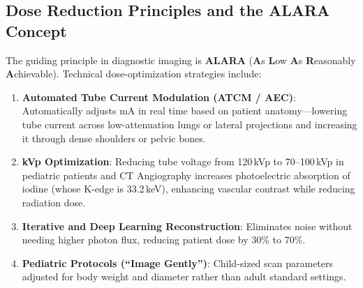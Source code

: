 \documentclass[11pt,a4paper]{article}
\begin{document}
\subsection{Dose Reduction Principles and the ALARA Concept}
The guiding principle in diagnostic imaging is \textbf{ALARA} (\textbf{A}s \textbf{L}ow \textbf{A}s \textbf{R}easonably \textbf{A}chievable). Technical dose-optimization strategies include:
\begin{enumerate}
    \item \textbf{Automated Tube Current Modulation (ATCM / AEC)}: Automatically adjusts mA in real time based on patient anatomy—lowering tube current across low-attenuation lungs or lateral projections and increasing it through dense shoulders or pelvic bones.
    \item \textbf{kVp Optimization}: Reducing tube voltage from 120\,kVp to 70--100\,kVp in pediatric patients and CT Angiography increases photoelectric absorption of iodine (whose K-edge is 33.2\,keV), enhancing vascular contrast while reducing radiation dose.
    \item \textbf{Iterative and Deep Learning Reconstruction}: Eliminates noise without needing higher photon flux, reducing patient dose by 30\% to 70\%.
    \item \textbf{Pediatric Protocols (``Image Gently'')}: Child-sized scan parameters adjusted for body weight and diameter rather than adult standard settings.
\end{enumerate}
\end{document}
